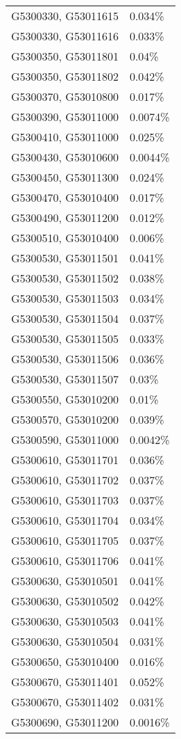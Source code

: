 \begin{longtable}[]{@{}ll@{}}
G5300330, G53011615 & 0.034\% \\
G5300330, G53011616 & 0.033\% \\
G5300350, G53011801 & 0.04\% \\
G5300350, G53011802 & 0.042\% \\
G5300370, G53010800 & 0.017\% \\
G5300390, G53011000 & 0.0074\% \\
G5300410, G53011000 & 0.025\% \\
G5300430, G53010600 & 0.0044\% \\
G5300450, G53011300 & 0.024\% \\
G5300470, G53010400 & 0.017\% \\
G5300490, G53011200 & 0.012\% \\
G5300510, G53010400 & 0.006\% \\
G5300530, G53011501 & 0.041\% \\
G5300530, G53011502 & 0.038\% \\
G5300530, G53011503 & 0.034\% \\
G5300530, G53011504 & 0.037\% \\
G5300530, G53011505 & 0.033\% \\
G5300530, G53011506 & 0.036\% \\
G5300530, G53011507 & 0.03\% \\
G5300550, G53010200 & 0.01\% \\
G5300570, G53010200 & 0.039\% \\
G5300590, G53011000 & 0.0042\% \\
G5300610, G53011701 & 0.036\% \\
G5300610, G53011702 & 0.037\% \\
G5300610, G53011703 & 0.037\% \\
G5300610, G53011704 & 0.034\% \\
G5300610, G53011705 & 0.037\% \\
G5300610, G53011706 & 0.041\% \\
G5300630, G53010501 & 0.041\% \\
G5300630, G53010502 & 0.042\% \\
G5300630, G53010503 & 0.041\% \\
G5300630, G53010504 & 0.031\% \\
G5300650, G53010400 & 0.016\% \\
G5300670, G53011401 & 0.052\% \\
G5300670, G53011402 & 0.031\% \\
G5300690, G53011200 & 0.0016\% \\

\end{longtable}
